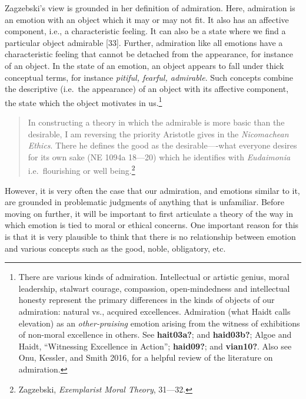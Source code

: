 \documentclass[phdthesis,12pt,final]{wuthesis}
\theoremstyle{definition}
\theoremstyle{definition}
\theoremstyle{definition}
\theoremstyle{definition}
\theoremstyle{remark}
\begin{document}
Zagzebski's view is grounded in her definition of admiration. Here, admiration is an emotion with an object which it may or may not fit. It also has an affective component, i.e., a characteristic feeling. It can also be a state where we find a particular object admirable {[}33{]}. Further, admiration like all emotions have a characteristic feeling that cannot be detached from the appearance, for instance of an object. In the state of an emotion, an object appears to fall under thick conceptual terms, for instance \emph{pitiful, fearful, admirable}. Such concepts combine the descriptive (i.e.~the appearance) of an object with its affective component, the state which the object motivates in us.\footnote{There are various kinds of admiration. Intellectual or artistic genius, moral leadership, stalwart courage, compassion, open-mindedness and intellectual honesty represent the primary differences in the kinds of objects of our admiration: natural vs., acquired excellences. Admiration (what Haidt calls elevation) as an \emph{other-praising} emotion arising from the witness of exhibitions of non-moral excellence in others. See \textbf{hait03a?}; and \textbf{haid03b?}; Algoe and Haidt, {``Witnessing Excellence in Action''}; \textbf{haid09?}; and \textbf{vian10?}. Also see Onu, Kessler, and Smith 2016, for a helpful review of the literature on admiration.}

\begin{quote}
In constructing a theory in which the admirable is more basic than the desirable, I am reversing the priority Aristotle gives in the \emph{Nicomachean Ethics}. There he defines the good as the desirable----what everyone desires for its own sake (NE 1094a 18---20) which he identifies with \emph{Eudaimonia} i.e.~flourishing or well being.\footnote{Zagzebski, \emph{Exemplarist {Moral Theory}}, 31---32.}
\end{quote}

However, it is very often the case that our admiration, and emotions similar to it, are grounded in problematic judgments of anything that is unfamiliar. Before moving on further, it will be important to first articulate a theory of the way in which emotion is tied to moral or ethical concerns. One important reason for this is that it is very plausible to think that there is no relationship between emotion and various concepts such as the good, noble, obligatory, etc.
\end{document}
